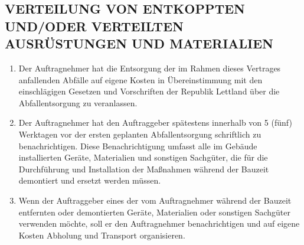 \begin{multicols}{2}
   \subsection{VERTEILUNG VON ENTKOPPTEN UND/ODER VERTEILTEN AUSRÜSTUNGEN UND MATERIALIEN}
   \begin{enumerate}
   \item Der Auftragnehmer hat die Entsorgung der im Rahmen dieses Vertrages anfallenden Abfälle auf eigene Kosten in Übereinstimmung mit den einschlägigen Gesetzen und Vorschriften der Republik Lettland über die Abfallentsorgung zu veranlassen.
   \item Der Auftragnehmer hat den Auftraggeber spätestens innerhalb von 5 (fünf) Werktagen vor der ersten geplanten Abfallentsorgung schriftlich zu benachrichtigen. Diese Benachrichtigung umfasst alle im Gebäude installierten Geräte, Materialien und sonstigen Sachgüter, die für die Durchführung und Installation der Maßnahmen während der Bauzeit demontiert und ersetzt werden müssen.
   \item Wenn der Auftraggeber eines der vom Auftragnehmer während der Bauzeit entfernten oder demontierten Geräte, Materialien oder sonstigen Sachgüter verwenden möchte, soll er den Auftragnehmer benachrichtigen und auf eigene Kosten Abholung und Transport organisieren.
   \end{enumerate}


\end{multicols}
